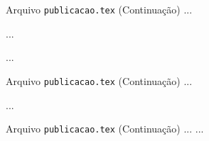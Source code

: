 \documentclass[10pt]{beamer}
\begin{document}
\begin{frame}{}
  \begin{meucomandolf}{Arquivo {\tt publicacao.tex} (Continuação)}
    ...
    \usepackage{rotating}
    \usepackage{dsfont}
    \usepackage{comment}
    
     
    
    \makeindex  
    ... 
     
    \maketitle  
    ...
  \end{meucomandolf}
\end{frame}

\begin{frame}{}
  \begin{meucomandolf}{Arquivo {\tt publicacao.tex} (Continuação)}
    ...
    
    
    
    \inicioIntroducao %
    ...
  \end{meucomandolf}
\end{frame}

\begin{frame}{}
  \begin{meucomandolf}{Arquivo {\tt publicacao.tex} (Continuação)}
    ...
    ...
  \end{meucomandolf}
\end{frame}
\end{document}
